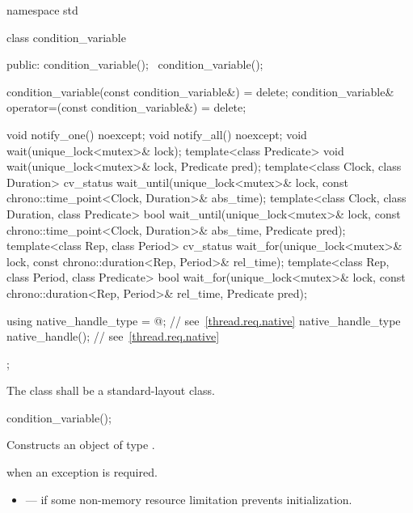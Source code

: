 %
\begin{codeblock}
namespace std {
  class condition_variable {
  public:
    condition_variable();
    ~condition_variable();

    condition_variable(const condition_variable&) = delete;
    condition_variable& operator=(const condition_variable&) = delete;

    void notify_one() noexcept;
    void notify_all() noexcept;
    void wait(unique_lock<mutex>& lock);
    template<class Predicate>
      void wait(unique_lock<mutex>& lock, Predicate pred);
    template<class Clock, class Duration>
      cv_status wait_until(unique_lock<mutex>& lock,
                           const chrono::time_point<Clock, Duration>& abs_time);
    template<class Clock, class Duration, class Predicate>
      bool wait_until(unique_lock<mutex>& lock,
                      const chrono::time_point<Clock, Duration>& abs_time,
                      Predicate pred);
    template<class Rep, class Period>
      cv_status wait_for(unique_lock<mutex>& lock,
                         const chrono::duration<Rep, Period>& rel_time);
    template<class Rep, class Period, class Predicate>
      bool wait_for(unique_lock<mutex>& lock,
                    const chrono::duration<Rep, Period>& rel_time,
                    Predicate pred);

    using native_handle_type = @\impdefnc@;          // see~\ref{thread.req.native}
    native_handle_type native_handle();                         // see~\ref{thread.req.native}
  };
}
\end{codeblock}

\pnum
The class  shall be a standard-layout class.

%
\begin{itemdecl}
condition_variable();
\end{itemdecl}

\begin{itemdescr}
\pnum
\effects Constructs an object of type .

\pnum
\throws {} when an exception is required.

\pnum
\errors
\begin{itemize}
\item {} --- if some non-memory resource
limitation prevents initialization.
\end{itemize}
\end{itemdescr}

